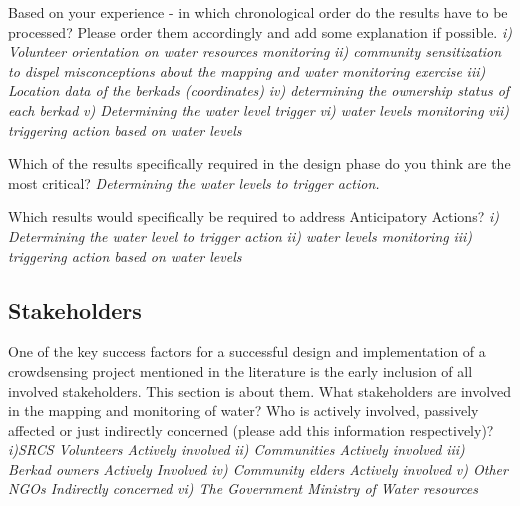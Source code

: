Based on your experience - in which chronological order do the results have to be processed? Please order them accordingly and add some explanation if possible.\newline
\textit{i) Volunteer orientation on water resources monitoring}\newline
\textit{ii) community sensitization to dispel misconceptions about the mapping and water monitoring exercise}\newline
\textit{iii) Location data of the berkads (coordinates)}\newline
\textit{iv) determining the ownership status of each berkad}\newline
\textit{v) Determining the water level trigger}\newline
\textit{vi) water levels monitoring}\newline
\textit{vii) triggering action based on water levels}

Which of the results specifically required in the design phase do you think are the most critical?\newline
\textit{Determining the water levels to trigger action.}

Which results would specifically be required to address Anticipatory Actions?\newline
\textit{i) Determining the water level to trigger action}\newline
\textit{ii) water levels monitoring}\newline
\textit{iii) triggering action based on water levels}

\subsection*{Stakeholders}
One of the key success factors for a successful design and implementation of a crowdsensing project mentioned in the literature is the early inclusion of all involved stakeholders. This section is about them.
What stakeholders are involved in the mapping and monitoring of water? Who is actively involved, passively affected or just indirectly concerned (please add this information respectively)?\newline
\textit{i)SRCS Volunteers Actively involved}\newline
\textit{ii) Communities Actively involved}\newline
\textit{iii) Berkad owners Actively Involved}\newline
\textit{iv) Community elders Actively involved}\newline
\textit{v) Other NGOs Indirectly concerned}\newline
\textit{vi) The Government Ministry of Water resources}

